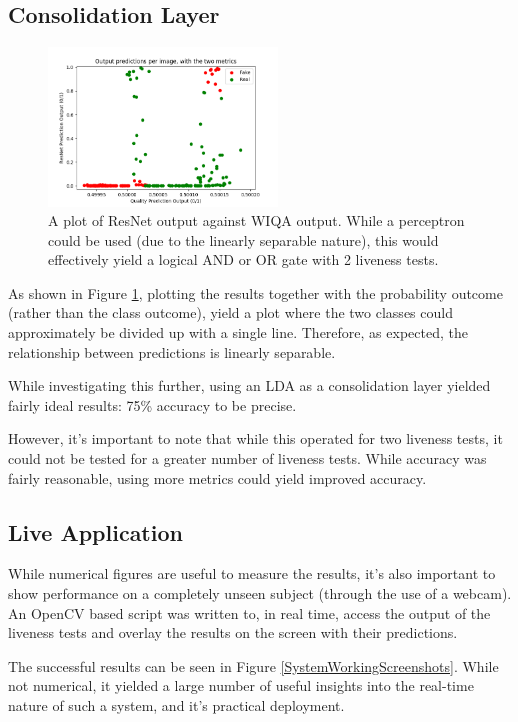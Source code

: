 \documentclass[12pt,a4paper]{article}
\begin{document}
    \subsection{Consolidation Layer}
    \begin{figure}
        \centering
        \includegraphics[width=230px]{LinearlySeparable.png}
        \caption{A plot of ResNet output against WIQA output. While a perceptron could be used (due to the linearly separable nature), this would effectively yield a logical AND or OR gate with 2 liveness tests.}
        \label{LinearlySeparableGraph}
    \end{figure}
  
    
        As shown in Figure \ref{LinearlySeparableGraph}, plotting the results together with the probability outcome (rather than the class outcome),
        yield a plot where the two classes could approximately be divided up with a single line. Therefore, as expected, the relationship between predictions is linearly separable.

        While investigating this further, using an LDA as a consolidation layer yielded fairly ideal results: 75\% accuracy to be precise. 

        However, it's important to note that while this operated for two liveness tests, it could not be tested for a greater number of liveness tests. While accuracy was fairly reasonable,
        using more metrics could yield improved accuracy.

    \subsection{Live Application}
        While numerical figures are useful to measure the results, it's also important to show performance on a completely unseen subject (through the use of a webcam). An OpenCV based script was
        written to, in real time, access the output of the liveness tests and overlay the results on the screen with their predictions. 

        The successful results can be seen in Figure \ref{SystemWorkingScreenshots}. While not numerical, it yielded a large number of useful insights into the real-time nature of such a system,
        and it's practical deployment.
\end{document}
